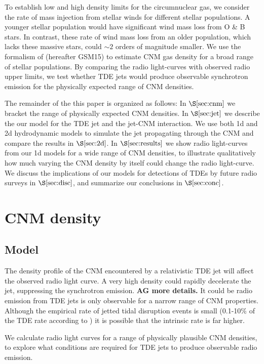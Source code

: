 \documentclass[usenatbib,fleqn]{mnras}
\begin{document}
To establish low and high density limits for the circumnuclear gas, we
consider the rate of mass injection from stellar winds for different
stellar populations. A younger stellar population would have
significant wind mass loss from O \& B stars. In contrast, these rate
of wind mass loss from an older population, which lacks these massive
stars, could $\sim 2$ orders of magnitude smaller. We use the
formalism of \citet{Generozov+2015} (hereafter GSM15) to estimate CNM
gas density for a broad range of stellar populations. By comparing the
radio light-curves with observed radio upper limits, we test whether
TDE jets would produce observable synchrotron emission for the
physically expected range of CNM densities.

The remainder of the this paper is organized as follows: In
$\S\ref{sec:cnm}$ we bracket the range of physically expected CNM
densities. In $\S\ref{sec:jet}$ we describe the our model for the TDE
jet and the jet-CNM interaction. We use both 1d and 2d hydrodynamic
models to simulate the jet propagating through the CNM and compare the
results in $\S\ref{sec:2d}$. In $\S\ref{sec:results}$ we show radio
light-curves from our 1d models for a wide range of CNM densities, to
illustrate qualitatively how much varying the CNM density by itself
could change the radio light-curve.  We discuss the implications of
our models for detections of TDEs by future radio surveys in
$\S\ref{sec:disc}$, and summarize our conclusions in
$\S\ref{sec:conc}$.

\section{CNM density}
\label{sec:cnm}

\subsection{Model}

The density profile of the CNM encountered by a relativistic TDE jet
will affect the observed radio light curve. A very high density could
rapidly decelerate the jet, suppressing the synchrotron emission.
{\bf AG more details.}  It could be radio emission from TDE jets is
only observable for a narrow range of CNM properties. Although the
empirical rate of jetted tidal disruption events is small (0.1-10\% of
the TDE rate according to \citealt{van-Velzen+2013}) it is possible
that the intrinsic rate is far higher.

We calculate radio light curves for a range of physically plausible
CNM densities, to explore what conditions are required for TDE jets to
produce observable radio emission. 
\end{document}
